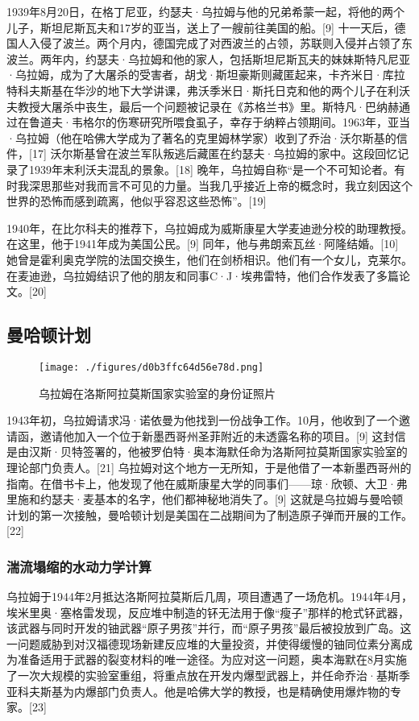 1939年8月20日，在格丁尼亚，约瑟夫·乌拉姆与他的兄弟希蒙一起，将他的两个儿子，斯坦尼斯瓦夫和17岁的亚当，送上了一艘前往美国的船。[9] 十一天后，德国人入侵了波兰。两个月内，德国完成了对西波兰的占领，苏联则入侵并占领了东波兰。两年内，约瑟夫·乌拉姆和他的家人，包括斯坦尼斯瓦夫的妹妹斯特凡尼亚·乌拉姆，成为了大屠杀的受害者，胡戈·斯坦豪斯则藏匿起来，卡齐米日·库拉特科夫斯基在华沙的地下大学讲课，弗沃季米日·斯托日克和他的两个儿子在利沃夫教授大屠杀中丧生，最后一个问题被记录在《苏格兰书》里。斯特凡·巴纳赫通过在鲁道夫·韦格尔的伤寒研究所喂食虱子，幸存于纳粹占领期间。1963年，亚当·乌拉姆（他在哈佛大学成为了著名的克里姆林学家）收到了乔治·沃尔斯基的信件，[17] 沃尔斯基曾在波兰军队叛逃后藏匿在约瑟夫·乌拉姆的家中。这段回忆记录了1939年末利沃夫混乱的景象。[18] 晚年，乌拉姆自称“是一个不可知论者。有时我深思那些对我而言不可见的力量。当我几乎接近上帝的概念时，我立刻因这个世界的恐怖而感到疏离，他似乎容忍这些恐怖”。[19]

1940年，在比尔科夫的推荐下，乌拉姆成为威斯康星大学麦迪逊分校的助理教授。在这里，他于1941年成为美国公民。[9] 同年，他与弗朗索瓦丝·阿隆结婚。[10] 她曾是霍利奥克学院的法国交换生，他们在剑桥相识。他们有一个女儿，克莱尔。在麦迪逊，乌拉姆结识了他的朋友和同事C·J·埃弗雷特，他们合作发表了多篇论文。[20]
\subsection{曼哈顿计划}
\begin{figure}[ht]
\centering
\texttt{[image: ./figures/d0b3ffc64d56e78d.png]}
\caption{乌拉姆在洛斯阿拉莫斯国家实验室的身份证照片} \label{fig_Ulam_3}
\end{figure}
1943年初，乌拉姆请求冯·诺依曼为他找到一份战争工作。10月，他收到了一个邀请函，邀请他加入一个位于新墨西哥州圣菲附近的未透露名称的项目。[9] 这封信是由汉斯·贝特签署的，他被罗伯特·奥本海默任命为洛斯阿拉莫斯国家实验室的理论部门负责人。[21] 乌拉姆对这个地方一无所知，于是他借了一本新墨西哥州的指南。在借书卡上，他发现了他在威斯康星大学的同事们——琼·欣顿、大卫·弗里施和约瑟夫·麦基本的名字，他们都神秘地消失了。[9] 这就是乌拉姆与曼哈顿计划的第一次接触，曼哈顿计划是美国在二战期间为了制造原子弹而开展的工作。[22]
\subsubsection{湍流塌缩的水动力学计算}  
乌拉姆于1944年2月抵达洛斯阿拉莫斯后几周，项目遭遇了一场危机。1944年4月，埃米里奥·塞格雷发现，反应堆中制造的钚无法用于像“瘦子”那样的枪式钚武器，该武器与同时开发的铀武器“原子男孩”并行，而“原子男孩”最后被投放到广岛。这一问题威胁到对汉福德现场新建反应堆的大量投资，并使得缓慢的铀同位素分离成为准备适用于武器的裂变材料的唯一途径。为应对这一问题，奥本海默在8月实施了一次大规模的实验室重组，将重点放在开发内爆型武器上，并任命乔治·基斯季亚科夫斯基为内爆部门负责人。他是哈佛大学的教授，也是精确使用爆炸物的专家。[23]

